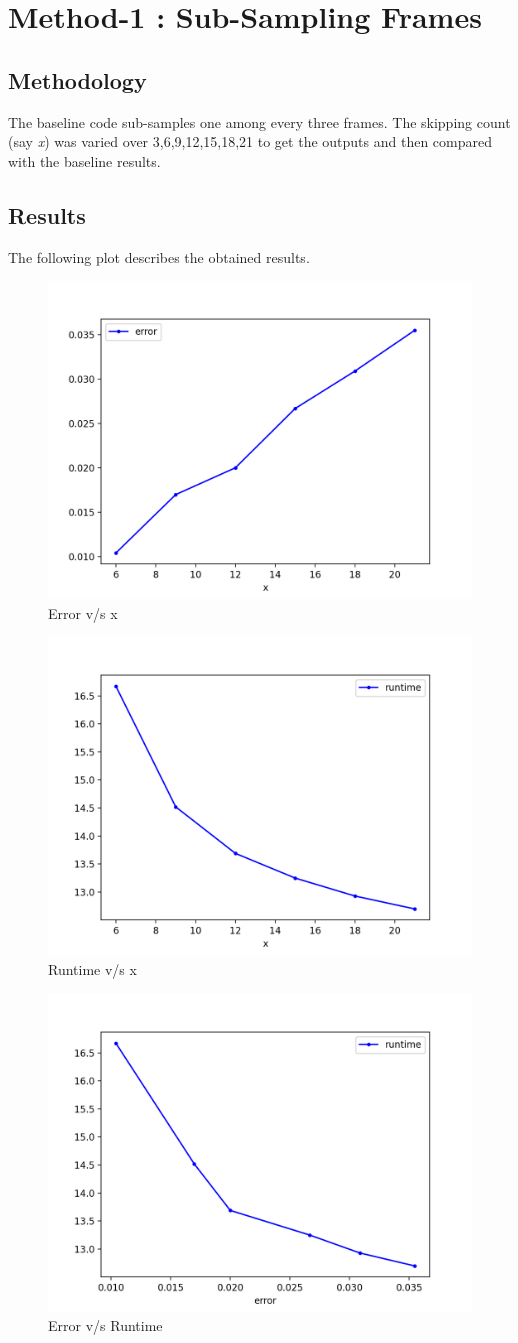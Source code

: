 \documentclass[a4paper]{article}
\begin{document}
\section*{Method-1 : Sub-Sampling Frames}
\subsection*{Methodology}
The baseline code sub-samples one among every three frames. The skipping count (say \textit{x}) was varied over 3,6,9,12,15,18,21 to get the outputs and then compared with the baseline results. 
\subsection*{Results}
The following plot describes the obtained results.
\begin{figure}[H]
    \centering
    \includegraphics[width=0.5\linewidth]{method-1-error.png}
    \caption{Error v/s x}
    \label{fig:method-1-error.png}
\end{figure}
\begin{figure}[H]
    \centering
    \includegraphics[width=0.5\linewidth]{method-1-runtime.png}
    \caption{Runtime v/s x}
    \label{fig:method-1-runtime.png}
\end{figure}
\begin{figure}[H]
    \centering
    \includegraphics[width=0.5\linewidth]{method-1.png}
    \caption{Error v/s Runtime}
    \label{fig:method-1.png}
\end{figure}
\end{document}
